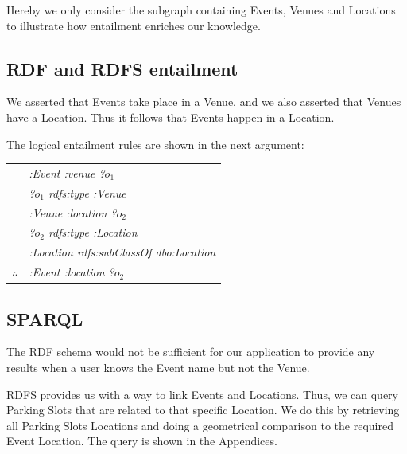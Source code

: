 \documentclass[runningheads,a4paper]{../../StyleFiles/llncs}
\begin{document}
Hereby we only consider the subgraph containing Events, Venues and Locations to illustrate how entailment enriches our knowledge. 


\subsection{RDF and RDFS entailment}
We asserted that Events take place in a Venue, and we also asserted that Venues have a Location. Thus it follows that Events happen in a Location.

The logical entailment rules are shown in the next argument:

\begin{center}
	\begin{tabular}{c@{\,}l@{}} 
  	& \textit{:Event 		:venue 				?$o_1$} \\
  	& \textit{?$o_1$ 		rdfs:type 			:Venue} \\   
  	& \textit{:Venue 		:location 			?$o_2$} \\ 
  	& \textit{?$o_2$ 		rdfs:type 			:Location} \\ 
  	& \textit{:Location		rdfs:subClassOf 	dbo:Location} \\
  	  	\arrayrulecolor{blue} \cline{2-2}
  	$\therefore$         
  	& \textit{:Event 		:location 				?$o_2$} \\
  	\end{tabular}
\end{center}


\subsection{SPARQL}
The RDF schema would not be sufficient for our application to provide any results when a user knows the Event name but not the Venue. 

RDFS provides us with a way to link Events and Locations. Thus, we can query Parking Slots that are related to that specific Location. We do this by retrieving all Parking Slots Locations and doing a geometrical comparison to the required Event Location. The query is shown in the Appendices. 
\end{document}
